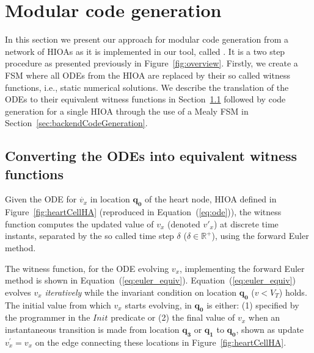 \section{Modular code generation}
\label{sec:codeGen}

In this section we present our approach for modular code generation from
a network of \acp{HIOA} as it is implemented in our tool, called
\ourTool. It is a two step procedure as presented previously in
Figure~\ref{fig:overview}. Firstly, we create a \ac{FSM} where all \acp{ODE} 
from the \ac{HIOA} are replaced by their so called witness functions, i.e.,
static numerical solutions. We describe the translation of the \acp{ODE}
to their equivalent witness functions in
Section~\ref{sec:converting-odes-into} followed by code generation for a
single \ac{HIOA} through the use of a Mealy \ac{FSM} in
Section~\ref{sec:backendCodeGeneration}.

\subsection{Converting the \acp{ODE} into equivalent witness functions}
\label{sec:converting-odes-into}

Given the \ac{ODE} for $\dot{v_x}$ in location $\mathbf{q_0}$ of the
heart node, \ac{HIOA} defined in Figure~\ref{fig:heartCellHA}
(reproduced in Equation~(\ref{eq:ode})), the witness function computes
the updated value of $v_{x}$ (denoted $v'_{x}$) at discrete time
instants, separated by the so called time step $\delta$
($\delta \in \mathbb{R}^{+}$), using the forward Euler method.  

The witness function, for the \ac{ODE} evolving $v_{x}$, implementing
the forward Euler method is shown in Equation~(\ref{eq:euler_equiv}).
Equation~(\ref{eq:euler_equiv}) evolves $v_{x}$ \emph{iteratively} while
the invariant condition on location $\mathbf{q_{0}}$ ($v < V_{T}$)
holds. The initial value from which $v_{x}$ starts evolving, in
$\mathbf{q_{0}}$ is either: (1) specified by the programmer in the
$Init$ predicate or (2) the final value of $v_{x}$ when an instantaneous
transition is made from location $\mathbf{q_{3}}$ or $\mathbf{q_{1}}$ to 
$\mathbf{q_{0}}$, shown as update $v^{\prime}_{x} = v_{x}$ on the edge 
connecting these locations in Figure~\ref{fig:heartCellHA}.

\setlength{\belowdisplayskip}{-0.5\baselineskip} 
\setlength{\belowdisplayshortskip}{-0.5\baselineskip}
\setlength{\abovedisplayskip}{-0.5\baselineskip} 
\setlength{\abovedisplayshortskip}{-0.5\baselineskip}

